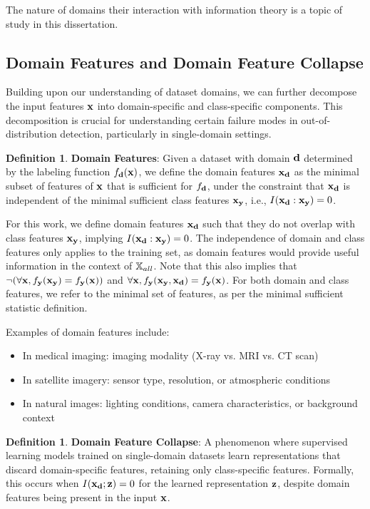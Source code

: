 \documentclass[11pt, oneside]{book}
\theoremstyle{plain}
\theoremstyle{definition}
\newtheorem{definition}[theorem]{Definition}
\theoremstyle{remark}
\begin{document}
The nature of domains their interaction with information theory is a topic of study in this dissertation.

\subsection{Domain Features and Domain Feature Collapse}

Building upon our understanding of dataset domains, we can further decompose the input features ${\mathbf{x}}$ into domain-specific and class-specific components. This decomposition is crucial for understanding certain failure modes in out-of-distribution detection, particularly in single-domain settings.

\begin{definition}
\textbf{Domain Features}: Given a dataset with domain ${\mathbf{d}}$ determined by the labeling function $f_{{\mathbf{d}}}({\mathbf{x}})$, we define the domain features ${\mathbf{x}}_{\mathbf{d}}$ as the minimal subset of features of ${\mathbf{x}}$ that is sufficient for $f_{{\mathbf{d}}}$, under the constraint that ${\mathbf{x}}_{\mathbf{d}}$ is independent of the minimal sufficient class features ${\mathbf{x}}_{\mathbf{y}}$, i.e., $I({\mathbf{x}}_{\mathbf{d}} : {\mathbf{x}}_{\mathbf{y}}) = 0$.
\label{def:domainfeatures}
\end{definition}

For this work, we define domain features ${\mathbf{x}}_{\mathbf{d}}$ such that they do not overlap with class features ${\mathbf{x}}_{\mathbf{y}}$, implying $I({\mathbf{x}}_{\mathbf{d}}:{\mathbf{x}}_{\mathbf{y}}) = 0$. The independence of domain and class features only applies to the training set, as domain features would provide useful information in the context of ${\mathbb{X}}_{all}$. Note that this also implies that $\neg(\forall{\mathbf{x}},  f_{\mathbf{y}}({\mathbf{x}}_{\mathbf{y}}) = f_{\mathbf{y}}({\mathbf{x}}))$ and $\forall{\mathbf{x}}, f_{\mathbf{y}}({\mathbf{x}}_{\mathbf{y}}, {\mathbf{x}}_{\mathbf{d}}) = f_{\mathbf{y}}({\mathbf{x}})$. For both domain and class features, we refer to the minimal set of features, as per the minimal sufficient statistic definition.

Examples of domain features include:
\begin{itemize}
    \item In medical imaging: imaging modality (X-ray vs. MRI vs. CT scan)
    \item In satellite imagery: sensor type, resolution, or atmospheric conditions
    \item In natural images: lighting conditions, camera characteristics, or background context
\end{itemize}

\begin{definition}
\textbf{Domain Feature Collapse}: A phenomenon where supervised learning models trained on single-domain datasets learn representations that discard domain-specific features, retaining only class-specific features. Formally, this occurs when $I({\mathbf{x}}_{\mathbf{d}}; {\mathbf{z}}) = 0$ for the learned representation ${\mathbf{z}}$, despite domain features being present in the input ${\mathbf{x}}$.
\label{def:domainfeaturecollapse}
\end{definition}
\end{document}
